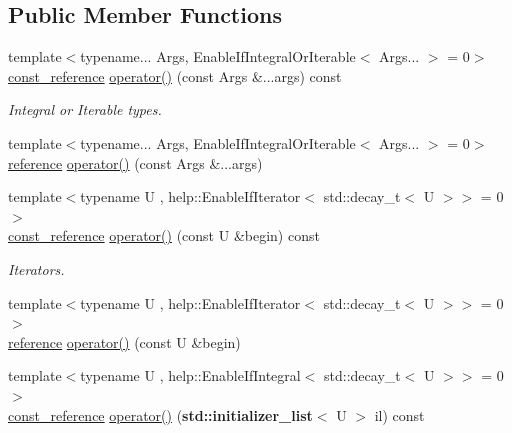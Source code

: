 \subsection*{Public Member Functions}
{\bf }\par
\begin{DoxyCompactItemize}
\item 
{\footnotesize template$<$typename... Args, Enable\+If\+Integral\+Or\+Iterable$<$ Args... $>$  = 0$>$ }\\\hyperlink{structcnt_1_1help_1_1Accessor_a8575d9de6bcb21a1bd6935d500cfcb89}{const\+\_\+reference} \hyperlink{structcnt_1_1help_1_1Accessor_afb70ea54cd8e9104c2767fd78984857d}{operator()} (const Args \&...args) const 
\begin{DoxyCompactList}\small\item\em Integral or Iterable types. \end{DoxyCompactList}\item 
{\footnotesize template$<$typename... Args, Enable\+If\+Integral\+Or\+Iterable$<$ Args... $>$  = 0$>$ }\\\hyperlink{structcnt_1_1help_1_1Accessor_a75659462be135d55bf8f4d6409b84a1f}{reference} \hyperlink{structcnt_1_1help_1_1Accessor_a30413bd6e851ed42d3ac78d839d6d45b}{operator()} (const Args \&...args)
\item 
{\footnotesize template$<$typename U , help\+::\+Enable\+If\+Iterator$<$ std\+::decay\+\_\+t$<$ U $>$$>$  = 0$>$ }\\\hyperlink{structcnt_1_1help_1_1Accessor_a8575d9de6bcb21a1bd6935d500cfcb89}{const\+\_\+reference} \hyperlink{structcnt_1_1help_1_1Accessor_a50f58d6227d262deddea121d510f393f}{operator()} (const U \&begin) const 
\begin{DoxyCompactList}\small\item\em Iterators. \end{DoxyCompactList}\item 
{\footnotesize template$<$typename U , help\+::\+Enable\+If\+Iterator$<$ std\+::decay\+\_\+t$<$ U $>$$>$  = 0$>$ }\\\hyperlink{structcnt_1_1help_1_1Accessor_a75659462be135d55bf8f4d6409b84a1f}{reference} \hyperlink{structcnt_1_1help_1_1Accessor_a4560af573dad5470885eac20b3fde6cb}{operator()} (const U \&begin)
\item 
{\footnotesize template$<$typename U , help\+::\+Enable\+If\+Integral$<$ std\+::decay\+\_\+t$<$ U $>$$>$  = 0$>$ }\\\hyperlink{structcnt_1_1help_1_1Accessor_a8575d9de6bcb21a1bd6935d500cfcb89}{const\+\_\+reference} \hyperlink{structcnt_1_1help_1_1Accessor_abb001ec4d22d578bd6d920bda29592b7}{operator()} ({\bf std\+::initializer\+\_\+list}$<$ U $>$ il) const 

\end{DoxyCompactItemize}
